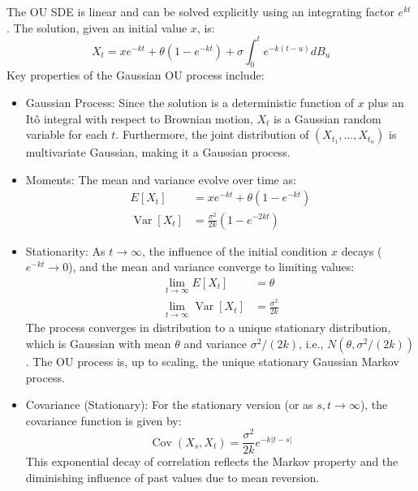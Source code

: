 \documentclass[11pt,twoside,openright]{report}
\begin{document}
The OU SDE is linear and can be solved explicitly using an integrating factor $e^{kt}$ \cite{ikeda1989stochastic}. The solution, given an initial value $x$, is:
\begin{equation}
X_t = x e^{-kt} + \theta (1 - e^{-kt}) + \sigma \int_0^t e^{-k(t-u)} dB_u
\label{eq:ou_solution}
\end{equation}
Key properties of the Gaussian OU process include:
\begin{itemize}
    \item Gaussian Process: Since the solution is a deterministic function of $x$ plus an Itô integral with respect to Brownian motion, $X_t$ is a Gaussian random variable for each $t$. Furthermore, the joint distribution of $(X_{t_1}, \dots, X_{t_n})$ is multivariate Gaussian, making it a Gaussian process.
    \item Moments: The mean and variance evolve over time as:
    \begin{align}
        E[X_t] &= x e^{-kt} + \theta (1 - e^{-kt}) \label{eq:ou_mean} \\
        \operatorname{Var}[X_t] &= \frac{\sigma^2}{2k} (1 - e^{-2kt}) \label{eq:ou_variance}
    \end{align}
    \item Stationarity: As $t \to \infty$, the influence of the initial condition $x$ decays ($e^{-kt} \to 0$), and the mean and variance converge to limiting values:
    \begin{align}
        \lim_{t \to \infty} E[X_t] &= \theta \label{eq:ou_stationary_mean} \\
        \lim_{t \to \infty} \operatorname{Var}[X_t] &= \frac{\sigma^2}{2k} \label{eq:ou_stationary_variance}
    \end{align}
    The process converges in distribution to a unique stationary distribution, which is Gaussian with mean $\theta$ and variance $\sigma^2 / (2k)$, i.e., $N(\theta, \sigma^2 / (2k))$. The OU process is, up to scaling, the unique stationary Gaussian Markov process.
    \item Covariance (Stationary): For the stationary version (or as $s, t \to \infty$), the covariance function is given by:
    \begin{equation}
    \operatorname{Cov}(X_s, X_t) = \frac{\sigma^2}{2k} e^{-k |t-s|}
    \label{eq:ou_covariance}
    \end{equation}
    This exponential decay of correlation reflects the Markov property and the diminishing influence of past values due to mean reversion.
\end{itemize}
\end{document}
